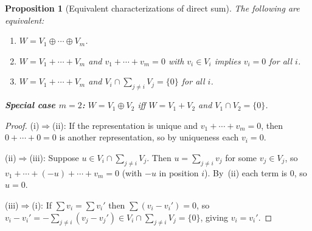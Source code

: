\documentclass[11pt]{article}
\theoremstyle{definition}
\theoremstyle{plain}
\newtheorem{proposition}{Proposition}[section]
\begin{document}
\begin{proposition}[Equivalent characterizations of direct sum]
  The following are equivalent:
  \begin{enumerate}[label=(\roman*)]
    \item $W = V_1\oplus\cdots\oplus V_m$.
    \item $W = V_1+\cdots+V_m$ and $v_1+\cdots+v_m = 0$ with $v_i\in V_i$
          implies $v_i = 0$ for all $i$.
    \item $W = V_1+\cdots+V_m$ and
          $V_i \cap \displaystyle\sum_{j\ne i} V_j = \{0\}$ for all $i$.
  \end{enumerate}
  \textbf{Special case $m=2$:} $W = V_1\oplus V_2$ iff $W = V_1+V_2$ and
  $V_1\cap V_2 = \{0\}$.
\end{proposition}
\begin{proof}
  (i)$\Rightarrow$(ii): If the representation is unique and $v_1+\cdots+v_m=0$,
  then $0+\cdots+0=0$ is another representation, so by uniqueness each $v_i=0$.

  (ii)$\Rightarrow$(iii): Suppose $u\in V_i\cap\sum_{j\ne i}V_j$.  Then
  $u = \sum_{j\ne i}v_j$ for some $v_j\in V_j$, so
  $v_1+\cdots+(-u)+\cdots+v_m = 0$ (with $-u$ in position $i$).
  By~(ii) each term is $0$, so $u=0$.

  (iii)$\Rightarrow$(i): If $\sum v_i = \sum v_i'$ then
  $\sum(v_i-v_i')=0$, so $v_i-v_i' = -\sum_{j\ne i}(v_j-v_j')
  \in V_i\cap\sum_{j\ne i}V_j = \{0\}$, giving $v_i=v_i'$.
\end{proof}
\end{document}

